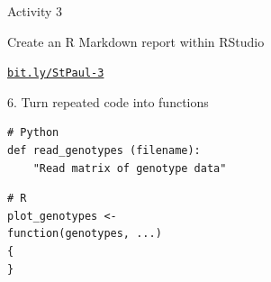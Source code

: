 \documentclass[12pt,t]{beamer}
\begin{document}
\begin{frame}[c]{Activity 3}


\vspace{24mm}


\begin{center}
\large
Create an R Markdown report within RStudio
\end{center}

\vspace{30mm}


\hfill
{\footnotesize \lolit
\href{http://bit.ly/StPaul-3}{\tt bit.ly/StPaul-3}
}



\end{frame}




\begin{frame}[fragile,c]{6. Turn repeated code into functions}

\begin{center}
\begin{minipage}[c]{10.8cm}
\begin{semiverbatim}
\lstset{basicstyle=\large}
\begin{lstlisting}[linewidth=10.8cm]
# Python
def read_genotypes (filename):
    "Read matrix of genotype data"
\end{lstlisting}
\end{semiverbatim}
\end{minipage}
\end{center}

\vspace*{-8mm}

\begin{center}
\begin{minipage}[c]{10.8cm}
\begin{semiverbatim}
\lstset{basicstyle=\large}
\begin{lstlisting}[linewidth=10.8cm]
# R
plot_genotypes <-
function(genotypes, ...)
{
}
\end{lstlisting}
\end{semiverbatim}
\end{minipage}
\end{center}

\end{frame}
\end{document}
